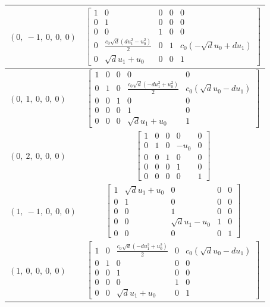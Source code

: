 \documentclass[11pt]{article}
\theoremstyle{definition}
\begin{document}
\begin{longtable}{|l|c|}
    \hline
    $\left( 0, \  -1, \  0, \  0, \  0\right)$ & ${\left[\begin{matrix}1 & 0 & 0 & 0 & 0\\0 & 1 & 0 & 0 & 0\\0 & 0 & 1 & 0 & 0\\0 & \frac{c_{0} \sqrt{d} \left(d u_{1}^{2} - u_{0}^{2}\right)}{2} & 0 & 1 & c_{0} \left(- \sqrt{d} u_{0} + d u_{1}\right)\\0 & \sqrt{d} u_{1} + u_{0} & 0 & 0 & 1\end{matrix}\right]}$ \\
    \hline
    $\left( 0, \  1, \  0, \  0, \  0\right)$ & ${\left[\begin{matrix}1 & 0 & 0 & 0 & 0\\0 & 1 & 0 & \frac{c_{0} \sqrt{d} \left(- d u_{1}^{2} + u_{0}^{2}\right)}{2} & c_{0} \left(\sqrt{d} u_{0} - d u_{1}\right)\\0 & 0 & 1 & 0 & 0\\0 & 0 & 0 & 1 & 0\\0 & 0 & 0 & \sqrt{d} u_{1} + u_{0} & 1\end{matrix}\right]}$ \\
    \hline
    $\left( 0, \  2, \  0, \  0, \  0\right)$ & ${\left[\begin{matrix}1 & 0 & 0 & 0 & 0\\0 & 1 & 0 & - u_{0} & 0\\0 & 0 & 1 & 0 & 0\\0 & 0 & 0 & 1 & 0\\0 & 0 & 0 & 0 & 1\end{matrix}\right]}$ \\
    \hline
    $\left( 1, \  -1, \  0, \  0, \  0\right)$ & ${\left[\begin{matrix}1 & \sqrt{d} u_{1} + u_{0} & 0 & 0 & 0\\0 & 1 & 0 & 0 & 0\\0 & 0 & 1 & 0 & 0\\0 & 0 & \sqrt{d} u_{1} - u_{0} & 1 & 0\\0 & 0 & 0 & 0 & 1\end{matrix}\right]}$ \\
    \hline
    $\left( 1, \  0, \  0, \  0, \  0\right)$ & ${\left[\begin{matrix}1 & 0 & \frac{c_{0} \sqrt{d} \left(- d u_{1}^{2} + u_{0}^{2}\right)}{2} & 0 & c_{0} \left(\sqrt{d} u_{0} - d u_{1}\right)\\0 & 1 & 0 & 0 & 0\\0 & 0 & 1 & 0 & 0\\0 & 0 & 0 & 1 & 0\\0 & 0 & \sqrt{d} u_{1} + u_{0} & 0 & 1\end{matrix}\right]}$ \\

\end{longtable}
\end{document}
